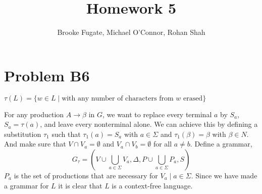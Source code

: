 \documentclass[12pt]{article}
\begin{document}
\pagestyle{plain}
\titleformat{\subsection}[runin]
  {\normalfont\large\bfseries}{\thesubsection}{1em}{}

\title{Homework 5}
\author{Brooke Fugate, Michael O'Connor, Rohan Shah}
\date{}

\maketitle

\section*{Problem B6}

$\tau(L) = \{w \in L \mid \text{with any number of characters from } w \text{ erased}\}$\newline 

For any production $A \rightarrow \beta$ in $G$, we want to replace every terminal $a$ by $S_a$, $S_a = \tau(a)$, and leave every nonterminal alone. We can achieve this by defining a substitution $\tau_1$ such that $\tau_1(a)=S_a$ with $a \in \Sigma$ and $\tau_1(\beta)=\beta$ with $\beta \in N$. And make sure that $V \cap V_a = \emptyset$ and $V_a \cap V_b = \emptyset$ for all $a \neq b$. \newline
Define a grammar, $$G_{\tau} = (V \cup \bigcup_{a \in \Sigma} V_a, \Delta, P \cup \bigcup_{a \in \Sigma} P_a, S)$$ $P_a$ is the set of productions that are necessary for $V_a \mid a \in \Sigma$. Since we have made a grammar for $L$ it is clear that $L$ is a context-free language.
\end{document}
